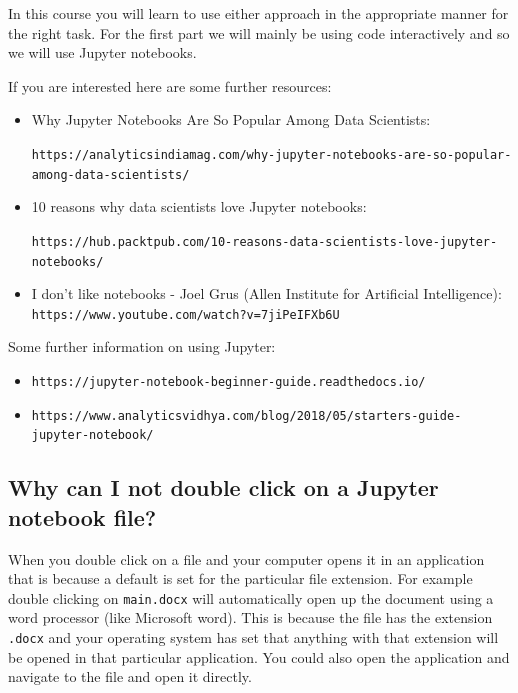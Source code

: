 In this course you will learn to use either approach in the appropriate manner
for the right task. For the first part we will mainly be using code
interactively and so we will use Jupyter notebooks.


If you are interested here are some further resources:
\begin{itemize}
\item 

Why Jupyter Notebooks Are So Popular Among Data Scientists: 

        \texttt{https://analyticsindiamag.com/why-jupyter-notebooks-are-so-popular-among-data-scientists/}

\item 

10 reasons why data scientists love Jupyter notebooks: 

        \texttt{https://hub.packtpub.com/10-reasons-data-scientists-love-jupyter-notebooks/}

\item 

I don’t like notebooks - Joel Grus (Allen Institute for Artificial
        Intelligence): \texttt{https://www.youtube.com/watch?v=7jiPeIFXb6U}

\end{itemize}


Some further information on using Jupyter:
\begin{itemize}
\item 

\texttt{https://jupyter-notebook-beginner-guide.readthedocs.io/}

\item 

\texttt{https://www.analyticsvidhya.com/blog/2018/05/starters-guide-jupyter-notebook/}

\end{itemize}


\subsection{Why can I not double click on a Jupyter notebook file?}

When you double click on a file and your computer opens it in an application
that is because a default is set for the particular file extension. For example
double clicking on \texttt{main.docx} will automatically open up the document using a
word processor (like Microsoft word). This is because the file has the extension
\texttt{.docx} and your operating system has set that anything with that extension will
be opened in that particular application. You could also open the
application and navigate to the file and open it directly.


